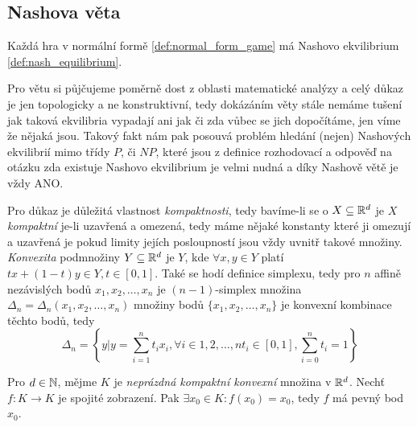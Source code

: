 \subsection{Nashova věta}
\begin{theorem}
\label{thm:nash_theorem}
Každá hra v normální formě \ref{def:normal_form_game} má Nashovo ekvilibrium \ref{def:nash_equilibrium}.
\end{theorem}
Pro větu si půjčujeme poměrně dost z oblasti matematické analýzy a celý důkaz je jen topologicky a ne konstruktivní, tedy dokázáním věty stále nemáme tušení jak taková ekvilibria vypadají ani jak či zda vůbec se jich dopočítáme, jen víme že nějaká jsou. 
Takový fakt nám pak posouvá problém hledání (nejen) Nashových ekvilibrií mimo třídy $P$, či $NP$, které jsou z definice rozhodovací a odpověď na otázku zda existuje Nashovo ekvilibrium je velmi nudná a díky Nashově větě je vždy ANO. 

Pro důkaz je důležitá vlastnost \textit{kompaktnosti}, tedy bavíme-li se o $X \subseteq \mathbb{R}^d$ je $X$ \textit{kompaktní} je-li uzavřená a omezená, tedy máme nějaké konstanty které ji omezují a uzavřená je pokud limity jejích posloupností jsou vždy uvnitř takové množiny. 
\textit{Konvexita} podmnožiny $Y \subseteq \mathbb{R}^d$ je $Y$, kde $\forall x,y \in Y$ platí $tx + (1-t)y \in Y, t \in [0,1]$. 
Také se hodí definice simplexu, tedy pro $n$ affině nezávislých bodů $x_1, x_2, \dots, x_n$ je $(n-1)$-simplex množina $\Delta_n = \Delta_n (x_1, x_2, \dots, x_n)$ množiny bodů $\{x_1, x_2, \dots, x_n\}$ je konvexní kombinace těchto bodů, tedy
\[
    \Delta_n = \left\{ y | y = \sum_{i = 1}^n t_ix_i, \forall i\in {1,2,\dots,n} t_i \in [0,1], \sum^n_{i=0} t_i = 1\right\}
\]

\begin{theorem}
\label{thm:brouwer_theorem}
Pro $d \in \mathbb{N}$, mějme $K$ je \textit{neprázdná kompaktní konvexní} množina v $\mathbb{R}^d$. Nechť $f: K \rightarrow K$ je spojité zobrazení. Pak $\exists x_0 \in K: f(x_0) = x_0$, tedy $f$ má pevný bod $x_0$. 
\end{theorem}

